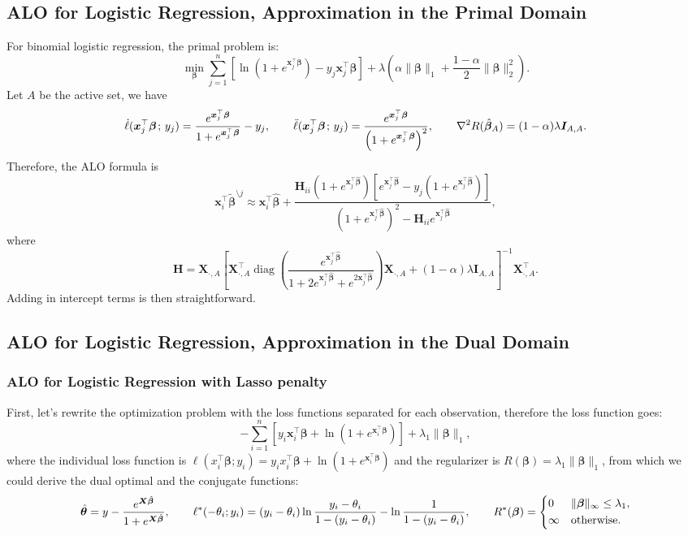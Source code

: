 \documentclass[11pt]{article}
\newcommand{\bx}{\bm{x}}
\newcommand{\bH}{\bm{H}}
\newcommand{\bI}{\bm{I}}
\newcommand{\bX}{\bm{X}}
\newcommand{\bbeta}{\bm{\beta}}
\newcommand{\btheta}{\bm{\theta}}
\newcommand{\semicol}{\nobreak\mskip2mu\mathpunct{}\nonscript\mkern-\thinmuskip{;}\mskip6muplus1mu\relax}
\DeclareMathOperator{\diag}{diag}
\begin{document}
\subsection{ALO for Logistic Regression, Approximation in the Primal Domain}
For binomial logistic regression, the primal problem is: \[\min_{\bbeta}\sum_{j=1}^{n}\left[\ln\left(1+e^{\bx_j^\top\bbeta}\right)-y_j\bx_j^\top\bbeta\right]+\lambda\left(\alpha\|\bbeta\|_1+\frac{1-\alpha}{2}\|\bbeta\|_2^2\right).\] Let \(A\) be the active set, we have \[\dot{\ell}(\bx_j^\top\bbeta\semicol y_j)=\frac{e^{\bx_j^\top\bbeta}}{1+e^{\bx_j^\top\bbeta}}-y_j,\qquad\ddot{\ell}(\bx_j^\top\bbeta\semicol y_j)=\frac{e^{\bx_j^\top\bbeta}}{\left(1+e^{\bx_j^\top\bbeta}\right)^2},\qquad\nabla^2 R(\hat{\bbeta}_A)=(1-\alpha)\lambda\bI_{A,A}.\] Therefore, the ALO formula is \[\bx_i^\top\tilde{\bbeta}^{\setminus j}\approx\bx_i^\top\hat{\bbeta}+\frac{\bH_{ii}\left(1+e^{\bx_j^\top\hat{\bbeta}}\right)\left[e^{\bx_j^\top\hat{\bbeta}}-y_j\left(1+e^{\bx_j^\top\hat{\bbeta}}\right)\right]}{\left(1+e^{\bx_j^\top\hat{\bbeta}}\right)^2-\bH_{ii}e^{\bx_j^\top\hat{\bbeta}}},\] where \[\bH=\bX_{\cdot,A}\left[\bX_{\cdot,A}^\top\diag\left(\frac{e^{\bx_j^\top\hat{\bbeta}}}{1+2e^{\bx_j^\top\hat{\bbeta}}+e^{2\bx_j^\top\hat{\bbeta}}}\right)\bX_{\cdot,A}+(1-\alpha)\lambda\bI_{A,A}\right]^{-1}\bX_{\cdot,A}^\top.\] Adding in intercept terms is then straightforward.

\subsection{ALO for Logistic Regression, Approximation in the Dual Domain}
\subsubsection{ALO for Logistic Regression with Lasso penalty}
First, let's rewrite the optimization problem with the loss functions separated for each observation, therefore the loss function goes: \[-\sum_{i=1}^n\left[y_{i}\bx_{i}^{\top}\bbeta+\ln\left(1+e^{\bx_{i}^{\top}\bbeta}\right)\right]+\lambda_{1}\|\bbeta\|_{1},\]
where the individual loss function is $\ell(x_{i}^{\top}\bbeta ;y_{i}) = y_{i}x_{i}^{\top}\bbeta+\ln(1+e^{\bx_{i}^{\top}\bbeta})$ and the regularizer is $R(\bbeta) = \lambda_{1}\|\bbeta\|_{1}$, from which we could derive the dual optimal and the conjugate functions: \[\hat{\btheta} = y - \frac{e^{\bX\hat{\bbeta}}}{1+e^{\bX\hat{\bbeta}}},\qquad \ell^{*}(-\theta_{i};y_{i})=(y_{i}-\theta_{i})\ln\frac{y_{i}-\theta_{i}}{1-(y_{i}-\theta_{i})}-\ln\frac{1}{1-(y_{i}-\theta_{i})},\qquad R^{*}(\bbeta) =\begin{dcases}
0 & \|\bbeta\|_{\infty} \leq \lambda_{1},\\
\infty & \text{otherwise}.\\
\end{dcases}\]
\end{document}

